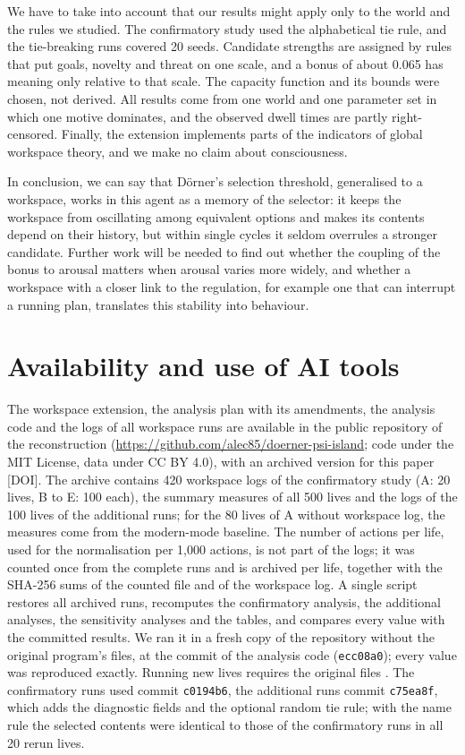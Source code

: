 \documentclass[11pt,a4paper]{article}
\newcommand{\todo}[1]{\textcolor{red!70!black}{[#1]}}
\newcommand{\code}[1]{\texttt{#1}}
\begin{document}
We have to take into account that our results might apply only to the world and the rules we studied. The confirmatory study used the alphabetical tie rule, and the tie-breaking runs covered 20 seeds. Candidate strengths are assigned by rules that put goals, novelty and threat on one scale, and a bonus of about 0.065 has meaning only relative to that scale. The capacity function and its bounds were chosen, not derived. All results come from one world and one parameter set in which one motive dominates, and the observed dwell times are partly right-censored. Finally, the extension implements parts of the indicators of global workspace theory, and we make no claim about consciousness.

In conclusion, we can say that D\"orner's selection threshold, generalised to a workspace, works in this agent as a memory of the selector: it keeps the workspace from oscillating among equivalent options and makes its contents depend on their history, but within single cycles it seldom overrules a stronger candidate. Further work will be needed to find out whether the coupling of the bonus to arousal matters when arousal varies more widely, and whether a workspace with a closer link to the regulation, for example one that can interrupt a running plan, translates this stability into behaviour.

\section*{Availability and use of AI tools}

The workspace extension, the analysis plan with its amendments, the analysis code and the logs of all workspace runs are available in the public repository of the reconstruction \citep{paper1} (\url{https://github.com/alec85/doerner-psi-island}; code under the MIT License, data under CC BY 4.0), with an archived version for this paper \todo{DOI}. The archive contains 420 workspace logs of the confirmatory study (A: 20 lives, B to E: 100 each), the summary measures of all 500 lives and the logs of the 100 lives of the additional runs; for the 80 lives of A without workspace log, the measures come from the modern-mode baseline. The number of actions per life, used for the normalisation per 1{,}000 actions, is not part of the logs; it was counted once from the complete runs and is archived per life, together with the SHA-256 sums of the counted file and of the workspace log. A single script restores all archived runs, recomputes the confirmatory analysis, the additional analyses, the sensitivity analyses and the tables, and compares every value with the committed results. We ran it in a fresh copy of the repository without the original program's files, at the commit of the analysis code (\code{ecc08a0}); every value was reproduced exactly. Running new lives requires the original files \citep{paper1}. The confirmatory runs used commit \code{c0194b6}, the additional runs commit \code{c75ea8f}, which adds the diagnostic fields and the optional random tie rule; with the name rule the selected contents were identical to those of the confirmatory runs in all 20 rerun lives.
\end{document}
